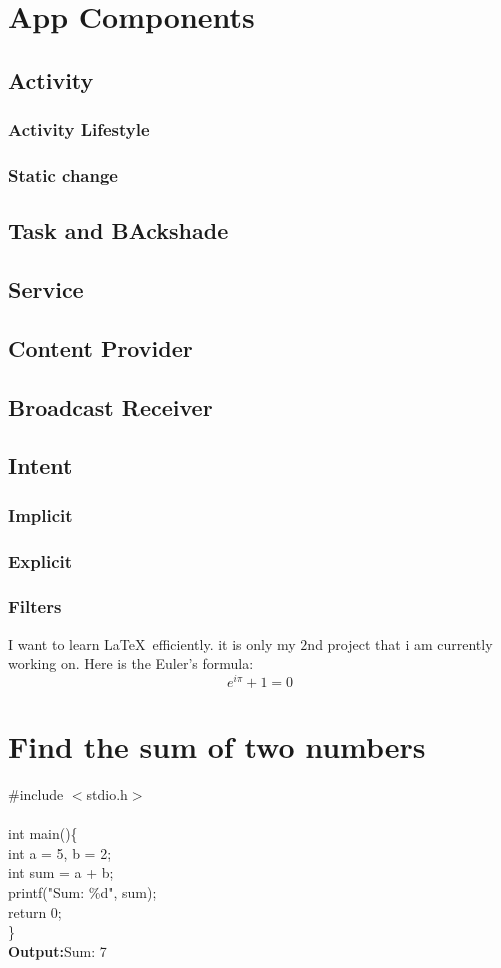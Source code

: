 \documentclass{article}
\begin{document}
\section{App Components}
\subsection{Activity}
\subsubsection{Activity Lifestyle}
\subsubsection{Static change}
\subsection{Task and BAckshade}
\subsection{Service}
\subsection{Content Provider}
\subsection{Broadcast Receiver}
\subsection{Intent}
\subsubsection{Implicit}
\subsubsection{Explicit}
\subsubsection{Filters}


I want to learn \LaTeX\ efficiently. it is only my $2$nd project that i am currently working on. 
Here is the Euler's formula:
$$e^{i\pi}+1=0$$
\section*{Find the sum of two numbers}
\#include $<$stdio.h$>$
\\
\\ int main()\{\\
\indent int a = 5, b = 2;\\
\indent int sum = a + b;\\
\indent printf("Sum: \%d", sum);\\
\indent return 0;\\
\}\\


\textbf{Output:}Sum: 7
\end{document}
